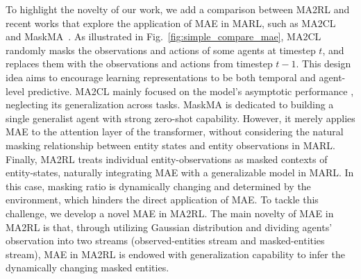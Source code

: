 To highlight the novelty of our work, we add a comparison between MA2RL and recent works that explore the application of MAE in MARL, such as MA2CL~\cite{song2023ma2cl} and MaskMA~\cite{liu2023masked}. As illustrated in Fig.~\ref{fig:simple_compare_mae}, MA2CL randomly masks the observations and actions of some agents at timestep $t$, and replaces them with the observations and actions from timestep $t-1$. This design idea aims to encourage learning representations to be both temporal and agent-level predictive. MA2CL mainly focused on the model’s asymptotic performance , neglecting its generalization across tasks. MaskMA is dedicated to building a single generalist agent with strong zero-shot capability. However, it merely applies MAE to the attention layer of the transformer, without considering the natural masking relationship between entity states and entity observations in MARL. Finally, MA2RL treats individual entity-observations as masked contexts of entity-states, naturally integrating MAE with a generalizable model in MARL. In this case, masking ratio is dynamically changing and determined by the environment, which hinders the direct application of MAE. To tackle this challenge, we develop a novel MAE in MA2RL. The main novelty of MAE in MA2RL is that, through utilizing Gaussian distribution and dividing agents' observation into two streams (observed-entities stream and masked-entities stream), MAE in MA2RL is endowed with generalization capability to infer the dynamically changing masked entities.



